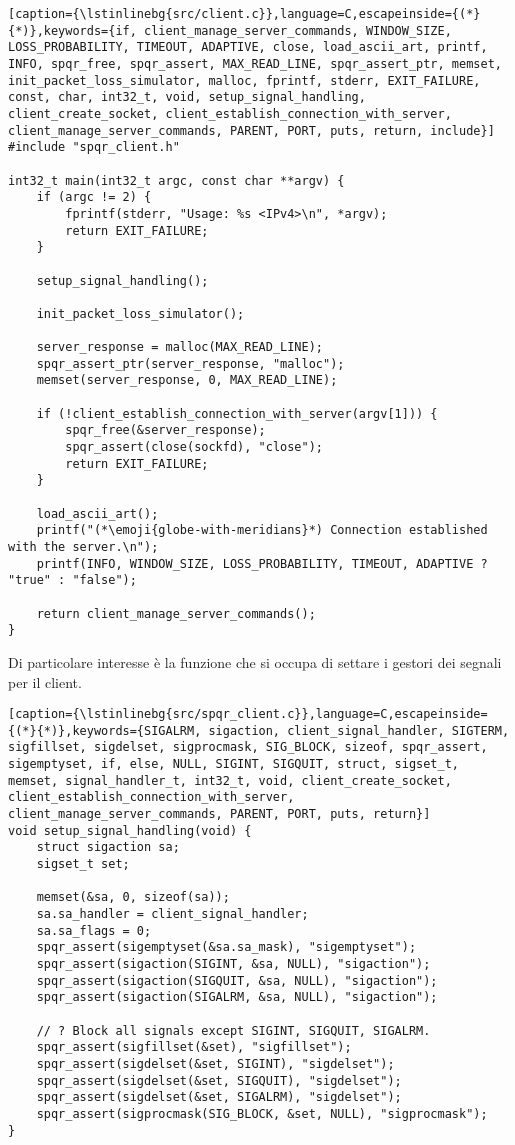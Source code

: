 \begin{lstlisting}[caption={\lstinlinebg{src/client.c}},language=C,escapeinside={(*}{*)},keywords={if, client_manage_server_commands, WINDOW_SIZE, LOSS_PROBABILITY, TIMEOUT, ADAPTIVE, close, load_ascii_art, printf, INFO, spqr_free, spqr_assert, MAX_READ_LINE, spqr_assert_ptr, memset, init_packet_loss_simulator, malloc, fprintf, stderr, EXIT_FAILURE, const, char, int32_t, void, setup_signal_handling, client_create_socket, client_establish_connection_with_server, client_manage_server_commands, PARENT, PORT, puts, return, include}]
#include "spqr_client.h"

int32_t main(int32_t argc, const char **argv) {
    if (argc != 2) {
        fprintf(stderr, "Usage: %s <IPv4>\n", *argv);
        return EXIT_FAILURE;
    }

    setup_signal_handling();

    init_packet_loss_simulator();

    server_response = malloc(MAX_READ_LINE);
    spqr_assert_ptr(server_response, "malloc");
    memset(server_response, 0, MAX_READ_LINE);

    if (!client_establish_connection_with_server(argv[1])) {
        spqr_free(&server_response);
        spqr_assert(close(sockfd), "close");
        return EXIT_FAILURE;
    }

    load_ascii_art();
    printf("(*\emoji{globe-with-meridians}*) Connection established with the server.\n");
    printf(INFO, WINDOW_SIZE, LOSS_PROBABILITY, TIMEOUT, ADAPTIVE ? "true" : "false");

    return client_manage_server_commands();
}
\end{lstlisting}

Di particolare interesse è la funzione  che si occupa di settare i gestori dei segnali per il client.

\begin{lstlisting}[caption={\lstinlinebg{src/spqr_client.c}},language=C,escapeinside={(*}{*)},keywords={SIGALRM, sigaction, client_signal_handler, SIGTERM, sigfillset, sigdelset, sigprocmask, SIG_BLOCK, sizeof, spqr_assert, sigemptyset, if, else, NULL, SIGINT, SIGQUIT, struct, sigset_t, memset, signal_handler_t, int32_t, void, client_create_socket, client_establish_connection_with_server, client_manage_server_commands, PARENT, PORT, puts, return}]
void setup_signal_handling(void) {
    struct sigaction sa;
    sigset_t set;

    memset(&sa, 0, sizeof(sa));
    sa.sa_handler = client_signal_handler;
    sa.sa_flags = 0;
    spqr_assert(sigemptyset(&sa.sa_mask), "sigemptyset");
    spqr_assert(sigaction(SIGINT, &sa, NULL), "sigaction");
    spqr_assert(sigaction(SIGQUIT, &sa, NULL), "sigaction");
    spqr_assert(sigaction(SIGALRM, &sa, NULL), "sigaction");
    
    // ? Block all signals except SIGINT, SIGQUIT, SIGALRM.
    spqr_assert(sigfillset(&set), "sigfillset");
    spqr_assert(sigdelset(&set, SIGINT), "sigdelset");
    spqr_assert(sigdelset(&set, SIGQUIT), "sigdelset");
    spqr_assert(sigdelset(&set, SIGALRM), "sigdelset");
    spqr_assert(sigprocmask(SIG_BLOCK, &set, NULL), "sigprocmask");
}
\end{lstlisting}

